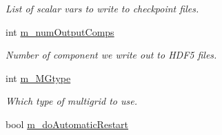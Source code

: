 \begin{DoxyCompactItemize}
\begin{DoxyCompactList}\small\item\em List of scalar vars to write to checkpoint files. \end{DoxyCompactList}\item 
\hypertarget{class_a_m_r_level_mushy_layer_a0f6d029ffba9fced9eea9b9abc193302}{int \hyperlink{class_a_m_r_level_mushy_layer_a0f6d029ffba9fced9eea9b9abc193302}{m\-\_\-num\-Output\-Comps}}\label{class_a_m_r_level_mushy_layer_a0f6d029ffba9fced9eea9b9abc193302}

\begin{DoxyCompactList}\small\item\em Number of component we write out to H\-D\-F5 files. \end{DoxyCompactList}\item 
\hypertarget{class_a_m_r_level_mushy_layer_a6d75b7140e1d162a99fd9e2253859977}{int \hyperlink{class_a_m_r_level_mushy_layer_a6d75b7140e1d162a99fd9e2253859977}{m\-\_\-\-M\-Gtype}}\label{class_a_m_r_level_mushy_layer_a6d75b7140e1d162a99fd9e2253859977}

\begin{DoxyCompactList}\small\item\em Which type of multigrid to use. \end{DoxyCompactList}\item 
\hypertarget{class_a_m_r_level_mushy_layer_ad040d219e6cc9b943f3d5e0042afb1fc}{bool \hyperlink{class_a_m_r_level_mushy_layer_ad040d219e6cc9b943f3d5e0042afb1fc}{m\-\_\-do\-Automatic\-Restart}}\label{class_a_m_r_level_mushy_layer_ad040d219e6cc9b943f3d5e0042afb1fc}


\end{DoxyCompactItemize}
